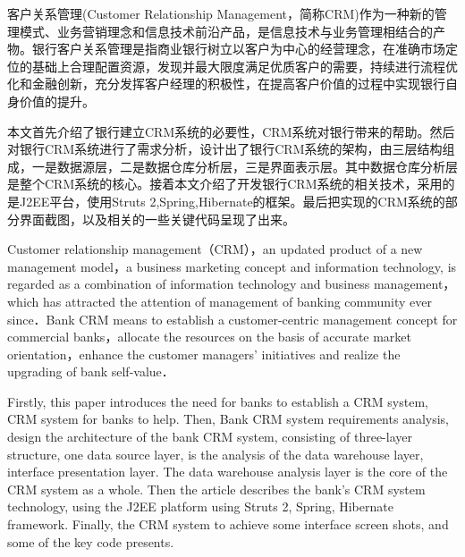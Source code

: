 \begin{cabstract}
客户关系管理(Customer Relationship Management，简称CRM)作为一种新的管理模式、业务营销理念和信息技术前沿产品，是信息技术与业务管理相结合的产物。银行客户关系管理是指商业银行树立以客户为中心的经营理念，在准确市场定位的基础上合理配置资源，发现并最大限度满足优质客户的需要，持续进行流程优化和金融创新，充分发挥客户经理的积极性，在提高客户价值的过程中实现银行自身价值的提升。

本文首先介绍了银行建立CRM系统的必要性，CRM系统对银行带来的帮助。然后对银行CRM系统进行了需求分析，设计出了银行CRM系统的架构，由三层结构组成，一是数据源层，二是数据仓库分析层，三是界面表示层。其中数据仓库分析层是整个CRM系统的核心。接着本文介绍了开发银行CRM系统的相关技术，采用的是J2EE平台，使用Struts 2,Spring,Hibernate的框架。最后把实现的CRM系统的部分界面截图，以及相关的一些关键代码呈现了出来。

\end{cabstract}

\begin{eabstract}
Customer relationship management（CRM），an updated product of a new management model，a business marketing concept and information technology, is regarded as a combination of information technology and business management，which has attracted the attention of management of banking community ever since．Bank CRM means to establish a customer-centric management concept for commercial banks，allocate the resources on the basis of accurate market orientation，enhance the customer managers’ initiatives and realize the upgrading of bank self-value．

   Firstly, this paper introduces the need for banks to establish a CRM system, CRM system for banks to help. Then, Bank CRM system requirements analysis, design the architecture of the bank CRM system, consisting of three-layer structure, one data source layer, is the analysis of the data warehouse layer, interface presentation layer. The data warehouse analysis layer is the core of the CRM system as a whole. Then the article describes the bank's CRM system technology, using the J2EE platform using Struts 2, Spring, Hibernate framework. Finally, the CRM system to achieve some interface screen shots, and some of the key code presents.
\end{eabstract}